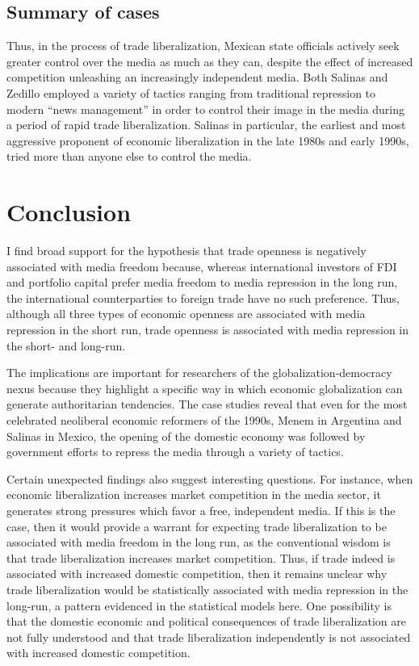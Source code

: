 \documentclass[12pt]{report}
\begin{document}
\subsection{Summary of cases}

Thus, in the process of trade liberalization, Mexican state officials actively seek greater control
over the media as much as they can, despite the effect of increased competition unleashing an
increasingly independent media. Both Salinas and Zedillo employed a variety of tactics ranging from
traditional repression to modern ``news management'' in order to control their image in the media
during a period of rapid trade liberalization. Salinas in particular, the earliest and most
aggressive proponent of economic liberalization in the late 1980s and early 1990s, tried more than
anyone else to control the media.


\section{Conclusion}

I find broad support for the hypothesis that trade openness is negatively associated with media
freedom because, whereas international investors of FDI and portfolio capital prefer media freedom
to media repression in the long run, the international counterparties to foreign trade have no such
preference. Thus, although all three types of economic openness are associated with media repression
in the short run, trade openness is associated with media repression in the short- and long-run.

The implications are important for researchers of the globalization-democracy nexus because they
highlight a specific way in which economic globalization can generate authoritarian tendencies. The
case studies reveal that even for the most celebrated neoliberal economic reformers of the 1990s,
Menem in Argentina and Salinas in Mexico, the opening of the domestic economy was followed by
government efforts to repress the media through a variety of tactics.

Certain unexpected findings also suggest interesting questions. For instance, when economic
liberalization increases market competition in the media sector, it generates strong pressures which
favor a free, independent media. If this is the case, then it would provide a warrant for expecting
trade liberalization to be associated with media freedom in the long run, as the conventional wisdom
is that trade liberalization increases market competition. Thus, if trade indeed is associated with
increased domestic competition, then it remains unclear why trade liberalization would be
statistically associated with media repression in the long-run, a pattern evidenced in the
statistical models here. One possibility is that the domestic economic and political consequences of
trade liberalization are not fully understood and that trade liberalization independently is not
associated with increased domestic competition.
\end{document}
